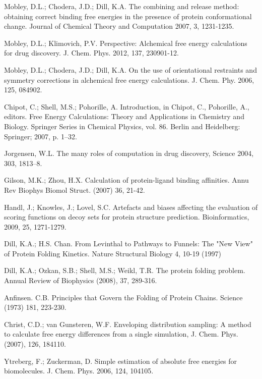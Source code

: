 \documentclass[12pt]{article}
\begin{document}
\begin{thebibliography}{99}
Mobley, D.L.; Chodera, J.D.; Dill, K.A. The combining and release method: obtaining correct binding free energies in
the presence of protein conformational change. Journal of Chemical Theory and Computation 2007, 3, 1231-1235.

Mobley, D.L.; Klimovich, P.V. Perspective: Alchemical free energy calculations for drug discovery.
J. Chem. Phys. 2012, 137, 230901-12.

Mobley, D.L.; Chodera, J.D.; Dill, K.A. On the use of orientational restraints and symmetry corrections in alchemical
free energy calculations. J. Chem. Phy. 2006, 125, 084902.

Chipot, C.; Shell, M.S.; Pohorille, A. Introduction, in Chipot, C., Pohorille, A., editors. Free Energy
Calculations: Theory and Applications in Chemistry and Biology. Springer Series in Chemical
Physics, vol. 86. Berlin and Heidelberg: Springer; 2007, p. 1–32.

Jorgensen, W.L. The many roles of computation in drug discovery, Science 2004, 303, 1813–8.

Gilson, M.K.; Zhou, H.X. Calculation of protein-ligand binding affinities. Annu Rev Biophys Biomol Struct. (2007) 36, 21-42.

Handl, J.; Knowles, J.; Lovel, S.C. Artefacts and biases affecting the evaluation of scoring
functions on decoy sets for protein structure prediction. Bioinformatics, 2009, 25, 1271-1279.

Dill, K.A.; H.S. Chan.  From Levinthal to Pathways to Funnels:  The "New View" of Protein Folding Kinetics.  Nature Structural Biology 4, 10-19 (1997)

Dill, K.A.; Ozkan, S.B.; Shell, M.S.; Weikl, T.R. The protein folding problem. Annual Review of Biophysics (2008), 37, 289-316.

Anfinsen. C.B. Principles that Govern the Folding of Protein Chains. Science (1973) 181, 223-230.

Christ, C.D.; van Gunsteren, W.F. Enveloping distribution sampling: A method to calculate free energy differences from a single simulation,
J. Chem. Phys. (2007), 126, 184110.

Ytreberg, F.; Zuckerman, D. Simple estimation of absolute free energies for biomolecules. J. Chem. Phys. 2006, 124, 104105.


\end{thebibliography}
\end{document}
